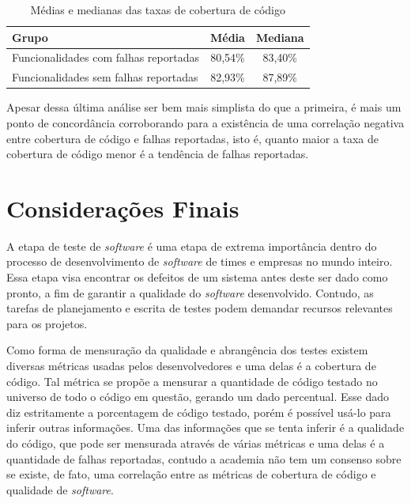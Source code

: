 \documentclass[11.5pt]{article}
\begin{document}
\begin{table}[ht]
\centering
\caption{Médias e medianas das taxas de cobertura de código}
\label{tab:mediasMedianasCC}
\begin{tabular}{|l|c|c|}
\hline
Grupo                                 & Média   & Mediana  \\ \hline
Funcionalidades com falhas reportadas & 80,54\% & 83,40\%  \\ \hline
Funcionalidades sem falhas reportadas & 82,93\% & 87,89\%  \\ \hline
\end{tabular}
\end{table}

Apesar dessa última análise ser bem mais simplista do que a primeira, é mais um ponto de
concordância corroborando para a existência de uma correlação negativa entre cobertura de código
e falhas reportadas, isto é, quanto maior a taxa de cobertura de código menor é a tendência de
falhas reportadas.



\section{Considerações Finais}

A etapa de teste de \textit{software} é uma etapa de extrema importância dentro do processo de
desenvolvimento de \textit{software} de times e empresas no mundo inteiro.
Essa etapa visa encontrar os defeitos de um sistema antes deste ser dado como pronto, a fim de
garantir a qualidade do \textit{software} desenvolvido.
Contudo, as tarefas de planejamento e escrita de testes podem demandar recursos relevantes para
os projetos.

Como forma de mensuração da qualidade e abrangência dos testes existem diversas métricas usadas
pelos desenvolvedores e uma delas é a cobertura de código.
Tal métrica se propõe a mensurar a quantidade de código testado no universo de todo o código em
questão, gerando um dado percentual.
Esse dado diz estritamente a porcentagem de código testado, porém é possível usá-lo para inferir
outras informações.
Uma das informações que se tenta inferir é a qualidade do código, que pode ser mensurada através de
várias métricas e uma delas é a quantidade de falhas reportadas, contudo a academia não tem um
consenso sobre se existe, de fato, uma correlação entre as métricas de cobertura de código e
qualidade de \textit{software}.
\end{document}
